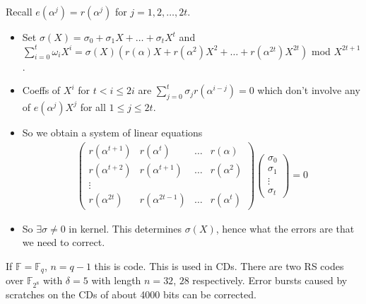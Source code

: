 Recall $e(\alpha^j) = r(\alpha^j)$ for $j = 1, 2, \dots, 2t$.
\begin{itemize}
    \item Set $\sigma(X) = \sigma_0 + \sigma_1 X + \dots + \sigma_t X^t$ and $\sum_{i=0}^{t} \omega_i X^i = \sigma(X)(r(\alpha) X + r(\alpha^2) X^2 + \dots + r(\alpha^{2t})X^{2t})$ mod $X^{2t + 1}$.
    \item Coeffs of $X^i$ for $t < i \leq 2i$ are $\sum_{j=0}^t \sigma_j r(\alpha^{i-j}) = 0$ which don't involve any of $e(\alpha^j)X^j$ for all $1 \leq j \leq 2t$.
    \item So we obtain a system of linear equations
    \begin{align*}
        \begin{pmatrix}
        r(\alpha^{t+1}) & r(\alpha^t) & \dots & r(\alpha) \\
        r(\alpha^{t+2}) & r(\alpha^{t+1}) & \dots & r(\alpha^2) \\
        \vdots &  &  &  \\
        r(\alpha^{2t}) & r(\alpha^{2t-1}) & \dots & r(\alpha^{t})
        \end{pmatrix}
        \begin{pmatrix}\sigma_0 \\ \sigma_1 \\ \vdots\\ \sigma_t \end{pmatrix}
        = 0
    \end{align*}
    \item So $\exists \sigma \neq 0$ in kernel.
    This determines $\sigma(X)$, hence what the errors are that we need to correct.
\end{itemize}

\begin{example}
    If $\mathbb{F} = \mathbb{F}_q$, $n = q - 1$ this is  code.
    This is used in CDs.
    There are two RS codes over $\mathbb{F}_{2^8}$ with $\delta = 5$ with length $n = 32$, $28$ respectively.
    Error bursts caused by scratches on the CDs of about 4000 bits can be corrected.
\end{example}

